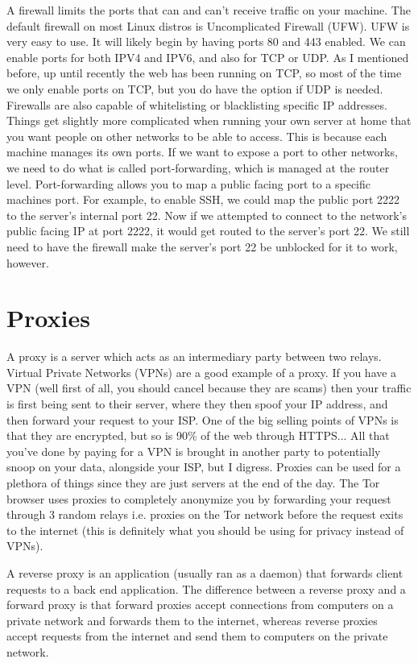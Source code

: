 \documentclass{article}
\begin{document}
A firewall limits the ports that can and can't receive traffic on your machine. The default firewall on most
Linux distros is Uncomplicated Firewall (UFW). UFW is very easy to use. It will likely begin by having ports
80 and 443 enabled. We can enable ports for both IPV4 and IPV6, and also for TCP or UDP. As I mentioned before,
up until recently the web has been running on TCP, so most of the time we only enable ports on TCP, but you do
have the option if UDP is needed. Firewalls are also capable of whitelisting or blacklisting specific IP
addresses. Things get slightly more complicated when running your own server at home that you want people on
other networks to be able to access. This is because each machine manages its own ports. If we want to expose
a port to other networks, we need to do what is called port-forwarding, which is managed at the router level.
Port-forwarding allows you to map a public facing port to a specific machines port. For example, to enable
SSH, we could map the public port 2222 to the server's internal port 22. Now if we attempted to connect to the
network's public facing IP at port 2222, it would get routed to the server's port 22. We still need to have
the firewall make the server's port 22 be unblocked for it to work, however.

\section{Proxies}

A proxy is a server which acts as an intermediary party between two relays. Virtual Private Networks (VPNs) are
a good example of a proxy. If you have a VPN (well first of all, you should cancel because they are scams)
then your traffic is first being sent to their server, where they then spoof your IP address, and then forward
your request to your ISP. One of the big selling points of VPNs is that they are encrypted, but so is 90\%
of the web through HTTPS... All that you've done by paying for a VPN is brought in another party to potentially
snoop on your data, alongside your ISP, but I digress. Proxies can be used for a plethora of things since they
are just servers at the end of the day. The Tor browser uses proxies to completely anonymize you by forwarding
your request through 3 random relays i.e. proxies on the Tor network before the request exits to the internet
(this is definitely what you should be using for privacy instead of VPNs).

A reverse proxy is an application (usually ran as a daemon) that forwards client requests to a back end
application. The difference between a reverse proxy and a forward proxy is that forward
proxies accept connections from computers on a private network and forwards them to the internet, whereas
reverse proxies accept requests from the internet and send them to computers on the private network.
\end{document}
